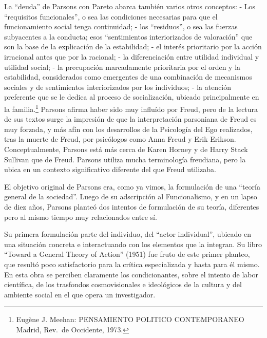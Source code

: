 \documentclass[
]{book}
\begin{document}
La ``deuda'' de Parsons con Pareto abarca también varios otros conceptos: - Los ``requisitos funcionales'', o sea las condiciones necesarias para que el funcionamiento social tenga continuidad; - los ``residuos'', o sea las fuerzas subyacentes a la conducta; esos ``sentimientos interiorizados de valoración'' que son la base de la explicación de la estabilidad; - el interés prioritario por la acción irracional antes que por la racional; - la diferenciación entre utilidad individual y utilidad social; - la precupación marcadamente prioritaria por el orden y la estabilidad, considerados como emergentes de una combinación de mecanismos sociales y de sentimientos interiorizados por los individuos; - la atención preferente que se le dedica al proceso de socialización, ubicado principalmente en la familia.\footnote{Eugène J. Meehan: PENSAMIENTO POLITICO CONTEMPORANEO Madrid, Rev.~de Occidente, 1973.} Parsons afirma haber sido muy influído por Freud, pero de la lectura de sus textos surge la impresión de que la interpretación parsoniana de Freud es muy forzada, y más afín con los desarrollos de la Psicología del Ego realizados, tras la muerte de Freud, por psicólogos como Anna Freud y Erik Erikson. Conceptualmente, Parsons está más cerca de Karen Horney y de Harry Stack Sullivan que de Freud. Parsons utiliza mucha terminología freudiana, pero la ubica en un contexto significativo diferente del que Freud utilizaba.

El objetivo original de Parsons era, como ya vimos, la formulación de una ``teoría general de la sociedad''. Luego de su adscripción al Funcionalismo, y en un lapso de diez años, Parsons planteó dos intentos de formulación de su teoría, diferentes pero al mismo tiempo muy relacionados entre sí.

Su primera formulación parte del individuo, del ``actor individual'', ubicado en una situación concreta e interactuando con los elementos que la integran. Su libro ``Toward a General Theory of Action'' (1951) fue fruto de este primer planteo, que resultó poco satisfactorio para la crítica especializada y hasta para él mismo. En esta obra se perciben claramente los condicionantes, sobre el intento de labor científica, de los trasfondos cosmovisionales e ideológicos de la cultura y del ambiente social en el que opera un investigador.
\end{document}
